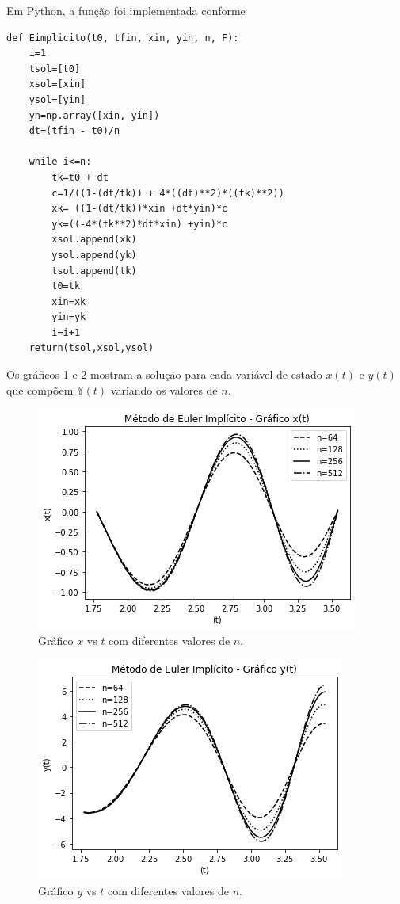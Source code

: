 \documentclass[amsmath,amssymb,floatfix]{revtex4}
\begin{document}
Em Python, a função foi implementada conforme
\begin{lstlisting}
def Eimplicito(t0, tfin, xin, yin, n, F):
    i=1
    tsol=[t0]
    xsol=[xin]
    ysol=[yin]
    yn=np.array([xin, yin])
    dt=(tfin - t0)/n
    
    while i<=n:
        tk=t0 + dt
        c=1/((1-(dt/tk)) + 4*((dt)**2)*((tk)**2)) 
        xk= ((1-(dt/tk))*xin +dt*yin)*c
        yk=((-4*(tk**2)*dt*xin) +yin)*c 
        xsol.append(xk)
        ysol.append(yk)
        tsol.append(tk)
        t0=tk
        xin=xk
        yin=yk
        i=i+1
    return(tsol,xsol,ysol)
\end{lstlisting} 

Os gráficos \ref{implx_difn} e \ref{imply_difn} mostram a solução para cada variável de estado $x(t)$ e $y(t)$ que compõem $\mathbb{Y}(t)$ variando os valores de $n$.
\begin{figure}[H]
\centering
\includegraphics[scale=0.56]{implx_diferentesn}
\caption{Gráfico $x$ vs $t$ com diferentes valores de $n$.}
\label{implx_difn}
\end{figure}

\begin{figure}[H]
\centering
\includegraphics[scale=0.56]{imply_diferentesn}
\caption{Gráfico $y$ vs $t$ com diferentes valores de $n$.}
\label{imply_difn}
\end{figure}
\end{document}
